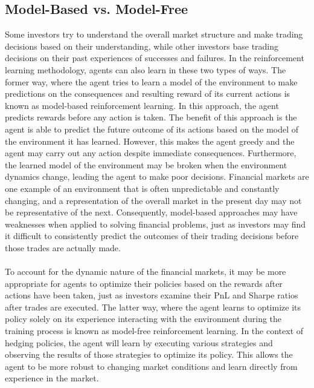 \subsection{Model-Based vs. Model-Free}
Some investors try to understand the overall market structure and make trading decisions based on their understanding, while other investors base trading decisions on their past experiences of successes and failures. In the reinforcement learning methodology, agents can also learn in these two types of ways. The former way, where the agent tries to learn a model of the environment to make predictions on the consequences and resulting reward of its current actions is known as model-based reinforcement learning. In this approach, the agent predicts rewards before any action is taken. The benefit of this approach is the agent is able to predict the future outcome of its actions based on the model of the environment it has learned. However, this makes the agent greedy and the agent may carry out any action despite immediate consequences. Furthermore, the learned model of the environment may be broken when the environment dynamics change, leading the agent to make poor decisions. Financial markets are one example of an environment that is often unpredictable and constantly changing, and a representation of the overall market in the present day may not be representative of the next. Consequently, model-based approaches may have weaknesses when applied to solving financial problems, just as investors may find it difficult to consistently predict the outcomes of their trading decisions before those trades are actually made.
\\ \\
To account for the dynamic nature of the financial markets, it may be more appropriate for agents to optimize their policies based on the rewards after actions have been taken, just as investors examine their PnL and Sharpe ratios after trades are executed. The latter way, where the agent learns to optimize its policy solely on its experience interacting with the environment during the training process is known as model-free reinforcement learning. In the context of hedging policies, the agent will learn by executing various strategies and observing the results of those strategies to optimize its policy. This allows the agent to be more robust to changing market conditions and learn directly from experience in the market.

